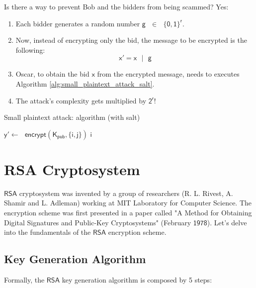 \documentclass{article}
\begin{document}
Is there a way to prevent Bob and the bidders from being scammed? Yes:

\begin{enumerate}
    \item Each bidder generates a random number $\mathsf{g \text{ } \in \text{ } \{0,1\}^{r}}$.
    \item Now, instead of encrypting only the bid, the message to be encrypted is the following:
    $$
        \mathsf{x' = x \text{ } | \text{ } g}
    $$
    \item Oscar, to obtain the bid $\mathsf{x}$ from the encrypted message, needs to executes Algorithm \ref{alg:small_plaintext_attack_salt}.
    \item The attack's complexity gets multiplied by $\mathsf{2^r}$!
\end{enumerate}

\begin{algorithm}
    \caption{Small plaintext attack: algorithm (with salt)}
    \label{alg:small_plaintext_attack_salt}
    \begin{algorithmic}
                \State $\mathsf{y' \gets \text{ } encrypt(K_{pub}, \{i, j\})}$
                    \Return $\mathsf{i}$
                \EndIf
            \EndFor
        \EndFor
    \end{algorithmic}
\end{algorithm}
\newpage
\section{RSA Cryptosystem}

\par \noindent $\mathsf{RSA}$ cryptosystem was invented by a group of researchers (R. L. Rivest, A. Shamir and L. Adleman) working at MIT Laboratory for Computer Science. The encryption scheme was first presented in a paper called "A Method for Obtaining Digital Signatures and Public-Key Cryptosystems" (February $\mathsf{1978}$). Let's delve into the fundamentals of the $\mathsf{RSA}$ encryption scheme.

\subsection{Key Generation Algorithm} 
Formally, the $\mathsf{RSA}$ key generation algorithm is composed by 5 steps:
\end{document}
